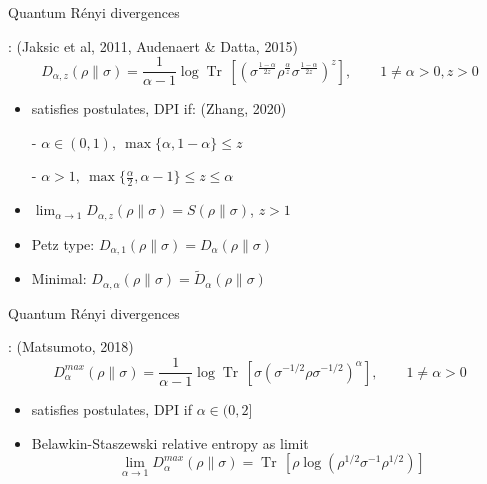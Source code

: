 \documentclass[mathserif]{beamer}
\newcommand{\<}{\langle}
\renewcommand{\>}{\rangle}
\newcommand{\Tr}{\operatorname{Tr}\,}
\begin{document}
\begin{frame}{Quantum R\'enyi divergences}

: {\small (Jaksic et al, 2011, Audenaert \&
Datta, 2015)}
\[
D_{\alpha,z}(\rho\|\sigma)
=\frac1{\alpha-1}\log\Tr\left[\left(\sigma^{\frac{1-\alpha}{2z}}\rho^{\frac{\alpha}{z}}\sigma^{\frac{1-\alpha}{2z}}\right)^z
\right],\qquad 1\ne \alpha>0, z>0
\]
\begin{itemize}
\item satisfies postulates, DPI if: {\small (Zhang, 2020)}

\medskip
\qquad - $\alpha\in (0,1),\ \max\{\alpha,1-\alpha\}\le z$

\medskip 
\qquad - $\alpha>1,\
\max\{\frac{\alpha}2,\alpha-1\}\le z\le \alpha$
\vskip 3mm
\item $\lim_{\alpha\to 1} D_{\alpha,z}(\rho\|\sigma)=S(\rho\|\sigma)$, $z>1$
\vskip 3mm
\item Petz type: $D_{\alpha,1}(\rho\|\sigma)=D_\alpha(\rho\|\sigma)$
\vskip 3mm
\item Minimal: $D_{\alpha,\alpha}(\rho\|\sigma)=\tilde D_\alpha(\rho\|\sigma)$
\end{itemize}



\end{frame}


\begin{frame}{Quantum R\'enyi divergences}

: {\small (Matsumoto, 2018)}
\[
D_\alpha^{max}(\rho\|\sigma)=\frac{1}{\alpha-1}\log
\Tr\left[\sigma\left(\sigma^{-1/2}\rho\sigma^{-1/2}\right)^\alpha\right],\qquad 1\ne
\alpha>0
\]
\begin{itemize}
\item satisfies postulates, DPI if $\alpha\in (0,2]$
\vskip 3mm
\item Belawkin-Staszewski relative entropy as limit
\[
\lim_{\alpha\to 1}D_\alpha^{max}(\rho\|\sigma)=\Tr\left[\rho
\log\left(\rho^{1/2}\sigma^{-1}\rho^{1/2}\right)\right]
\]


\end{itemize}

\end{frame}
\end{document}
